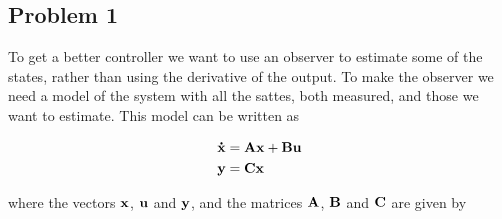\subsection{Problem 1}
To get a better controller we want to use an observer to estimate some of the states, rather than using the derivative of the output. To make the observer we need a model of the system with all the sattes, both measured, and those we want to estimate. This model can be written as

\begin{subequations}
	\begin{align*}
		\mathbf{\dot x} &= \mathbf{A}\mathbf{x} + \mathbf{B}\mathbf{u}\\
		\mathbf{y} &= \mathbf{C}\mathbf{x}
	\end{align*}
\end{subequations}

where the vectors $\mathbf{x}$, $\mathbf{u}$ and $\mathbf{y}$, and the matrices $\mathbf{A}$, $\mathbf{B}$ and $\mathbf{C}$ are given by

